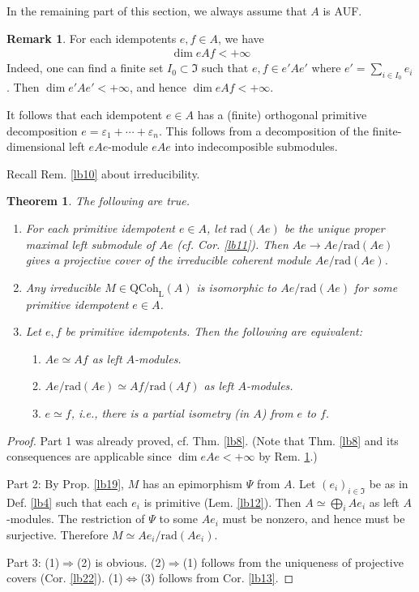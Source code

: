 \documentclass[11pt,b5paper,notitlepage]{article}
\theoremstyle{definition}
\newtheorem{rem}[df]{Remark}
\theoremstyle{plain}
\newtheorem{thm}[df]{Theorem}
\newcommand{\fk}{\mathfrak}
\newcommand{\eps}{\varepsilon}
\newcommand{\QC}{\mathrm{QCoh}_{\mathrm L}}
\newcommand{\rad}{\mathrm{rad}}
\numberwithin{equation}{section}
\begin{document}
In the remaining part of this section, we always assume that $A$ is AUF.


\begin{rem}\label{lb14}
For each idempotents $e,f\in A$, we have
\begin{align*}
\dim eAf<+\infty
\end{align*}
Indeed, one can find a finite set $I_0\subset \fk I$ such that $e,f\in e'Ae'$ where $e'=\sum_{i\in I_0}e_i$. Then $\dim e'Ae'<+\infty$, and hence $\dim eAf<+\infty$.

It follows that each idempotent $e\in A$ has a (finite) orthogonal primitive decomposition $e=\eps_1+\cdots+\eps_n$. This follows from a decomposition of the finite-dimensional left $eAe$-module $eAe$ into indecomposible submodules.   \hfill\qedsymbol
\end{rem}








Recall Rem. \ref{lb10} about irreducibility.


\begin{thm}\label{lb15}
The following are true.
\begin{enumerate}
\item For each primitive idempotent $e\in A$, let $\rad(Ae)$ be the unique proper maximal left submodule of $Ae$ (cf. Cor. \ref{lb11}). Then $Ae\rightarrow Ae/\rad(Ae)$ gives a projective cover of the irreducible coherent module $Ae/\rad(Ae)$.
\item Any irreducible $M\in\QC(A)$ is isomorphic to $Ae/\rad(Ae)$ for some primitive idempotent $e\in A$.
\item Let $e,f$ be primitive idempotents. Then the following are equivalent:
\begin{enumerate}[label=(\arabic*)]
\item $Ae\simeq Af$ as left $A$-modules.
\item $Ae/\rad(Ae)\simeq Af/\rad(Af)$ as left $A$-modules.
\item $e\simeq f$, i.e., there is a partial isometry (in $A$) from $e$ to $f$. 
\end{enumerate}
\end{enumerate} 
\end{thm}



\begin{proof}
Part 1 was already proved, cf. Thm. \ref{lb8}. (Note that Thm. \ref{lb8} and its consequences are applicable since $\dim eAe<+\infty$ by Rem. \ref{lb14}.)

Part 2: By Prop. \ref{lb19}, $M$ has an epimorphism $\Psi$ from $A$. Let $(e_i)_{i\in\fk I}$ be as in Def. \ref{lb4} such that each $e_i$ is primitive (Lem. \ref{lb12}). Then $A\simeq\bigoplus_i Ae_i$ as left $A$-modules. The restriction of $\Psi$ to some $Ae_i$ must be nonzero, and hence must be surjective. Therefore $M\simeq Ae_i/\rad(Ae_i)$.

Part 3: (1)$\Rightarrow$(2) is obvious. (2)$\Rightarrow$(1) follows from the uniqueness of projective covers (Cor. \ref{lb22}). (1)$\Leftrightarrow$(3) follows from Cor. \ref{lb13}.
\end{proof}
\end{document}
